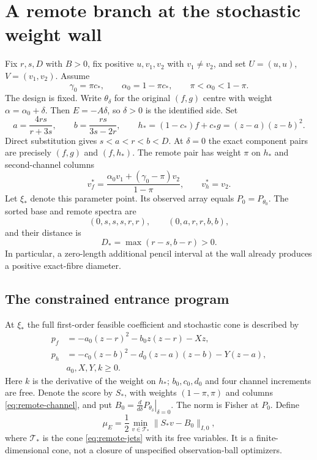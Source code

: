 \section{A remote branch at the stochastic weight wall}\label{sec:wall}
Fix $r,s,D$ with $B>0$, fix positive $u,v_1,v_2$ with $v_1\ne v_2$,
and set $U=(u,u)$, $V=(v_1,v_2)$. Assume
\begin{equation}\label{eq:wall-centre}
 \gamma_0=\pi c_*,\qquad \alpha_0=1-\pi c_*,\qquad
                   \pi<\alpha_0<1-\pi.
\end{equation}
The design is fixed. Write $\theta_\delta$ for the original $(f,g)$
centre with weight $\alpha=\alpha_0+\delta$. Then $E=-A\delta$,
so $\delta>0$ is the identified side. Set
\begin{equation}\label{eq:abstar}
 a=\frac{4rs}{r+3s},\qquad b=\frac{rs}{3s-2r},\qquad
 h_*=(1-c_*)f+c_*g=(z-a)(z-b)^2.
\end{equation}
Direct substitution gives $s<a<r<b<D$. At $\delta=0$ the exact
component pairs are precisely $(f,g)$ and $(f,h_*)$. The remote pair
has weight $\pi$ on $h_*$ and second-channel columns
\begin{equation}\label{eq:remote-channel}
 v_f^*=\frac{\alpha_0v_1+(\gamma_0-\pi)v_2}{1-\pi},\qquad v_h^*=v_2.
\end{equation}
Let $\xi_*$ denote this parameter point. Its observed array equals
$P_0=P_{\theta_0}$. The sorted base and remote spectra are
\[
 (0,s,s,s,r,r),\qquad (0,a,r,r,b,b),
\]
and their distance is
\begin{equation}\label{eq:Dstar}
 D_* =\max(r-s,b-r)>0.
\end{equation}
In particular, a zero-length additional pencil interval at the wall
already produces a positive exact-fibre diameter.

\subsection{The constrained entrance program}
At $\xi_*$ the full first-order feasible coefficient and stochastic
cone is described by
\begin{align}
 p_f&=-a_0(z-r)^2-b_0z(z-r)-Xz,\nonumber\\
 p_h&=-c_0(z-b)^2-d_0(z-a)(z-b)-Y(z-a),                 \label{eq:remote-jets}\\
 &a_0,X,Y,k\ge0.\nonumber
\end{align}
Here $k$ is the derivative of the weight on $h_*$; $b_0,c_0,d_0$ and
four channel increments are free. Denote the score by $S_*$, with
weights $(1-\pi,\pi)$ and columns \eqref{eq:remote-channel}, and put
$B_0=\left.\frac{d}{d\delta}P_{\theta_\delta}\right|_{\delta=0}$.
The norm is Fisher at $P_0$. Define
\begin{equation}\label{eq:mu}
 \mu_E=\frac12\min_{v\in\mathcal T_*}\|S_*v-B_0\|_{I,0},
\end{equation}
where $\mathcal T_*$ is the cone \eqref{eq:remote-jets} with its free
variables. It is a finite-dimensional cone, not a closure of unspecified
observation-ball optimizers.

